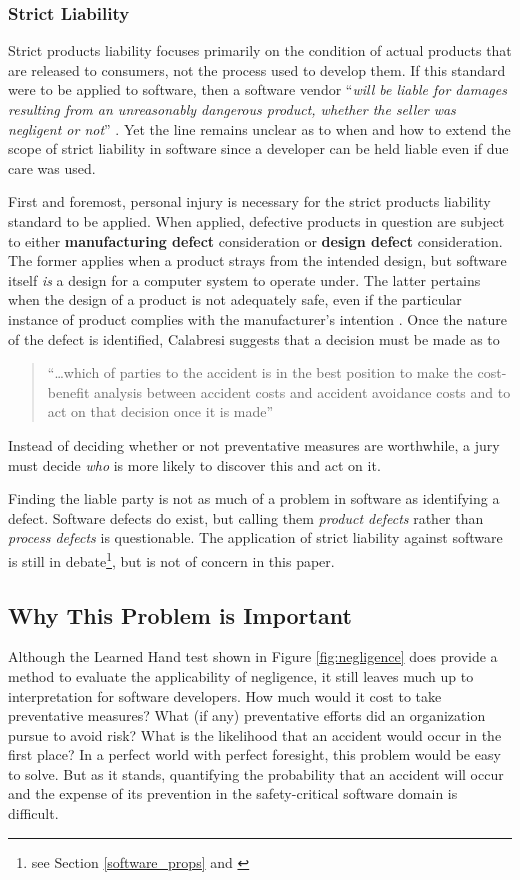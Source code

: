 \subsubsection{Strict Liability}
Strict products liability focuses primarily on the condition of actual products
that are released to consumers, not the process used to develop them. If this
standard were to be applied to software, then a software vendor ``\textit{will be
liable for damages resulting from an unreasonably dangerous product, whether the
seller was negligent or not}'' \cite{Burgunder2004}. Yet the line remains
unclear as to when and how to extend the scope of strict liability in software 
since a developer can be held liable even if due care was used.

First and foremost, personal injury is necessary for the strict products
liability standard to be applied. When applied, defective products in question
are subject to either \textbf{manufacturing defect} consideration or
\textbf{design defect} consideration. The former applies when a product strays
from the intended design, but software itself \textit{is} a design for a
computer system to operate under. The latter pertains when the design of a
product is not adequately safe, even if the particular instance of product
complies with the manufacturer's intention \cite{Turner1999}. Once the nature of
the defect is identified, Calabresi suggests that  a decision must be made as to

\begin{quote}
``\ldots which of parties to the accident is in the best position to make the
cost-benefit analysis between accident costs and accident avoidance costs and to
act on that decision once it is made'' \cite{Calabresi1972}
\end{quote}
 Instead of deciding whether or not preventative
measures are worthwhile, a jury must decide \textit{who} is more likely to 
discover this and act on it.

Finding the liable party is not as much of a problem in software as identifying
a defect. Software defects do exist, but calling them \textit{product defects} 
rather than \textit{process defects} is questionable. The application of strict
liability against software is still in debate\footnote{see Section
\ref{software_props} and \cite{Turner2000}}, but is not of concern in this
paper.

\subsection{Why This Problem is Important}
Although the Learned Hand test shown in Figure \ref{fig:negligence} does provide
a method to evaluate the applicability of negligence, it still leaves much up to
interpretation for software developers. How much would it cost to take preventative
measures? What (if any) preventative efforts did an organization pursue to avoid
risk? What is the likelihood that an accident would occur in the first place? In
a perfect world with perfect foresight, this problem would be easy to solve. But
as it stands, quantifying the probability that an accident will occur and the
expense of its prevention in the safety-critical software domain is difficult.

